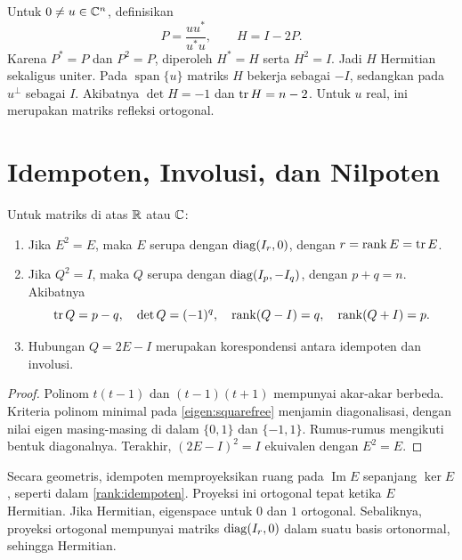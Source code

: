 \begin{exam}
    Untuk $0\ne u\in\mathbb{C}^n$, definisikan
    \[
        P=\frac{uu^*}{u^*u},\qquad H=I-2P.
    \]
    Karena $P^*=P$ dan $P^2=P$, diperoleh $H^*=H$ serta $H^2=I$.
    Jadi $H$ Hermitian sekaligus uniter. Pada $\operatorname{span}\{u\}$
    matriks $H$ bekerja sebagai $-I$, sedangkan pada $u^\perp$
    sebagai $I$. Akibatnya $\det H=-1$ dan $\operatorname{tr} H=n-2$.
    Untuk $u$ real, ini merupakan matriks refleksi ortogonal.
\end{exam}

\section{Idempoten, Involusi, dan Nilpoten}
\label{khusus:polinomial}

\begin{teorema}
    Untuk matriks di atas $\mathbb{R}$ atau $\mathbb{C}$:
    \begin{enumerate}[label=(\roman*),nosep]
        \item Jika $E^2=E$, maka $E$ serupa dengan $\operatorname{diag}(I_r,0)$,
            dengan $r=\operatorname{rank} E=\operatorname{tr} E$.
        \item Jika $Q^2=I$, maka $Q$ serupa dengan $\operatorname{diag}(I_p,-I_q)$,
            dengan $p+q=n$. Akibatnya
            \[
                \operatorname{tr} Q=p-q,\quad\det Q=(-1)^q,\quad
                \operatorname{rank}(Q-I)=q,\quad\operatorname{rank}(Q+I)=p.
            \]
        \item Hubungan $Q=2E-I$ merupakan korespondensi antara
            idempoten dan involusi.
    \end{enumerate}
\end{teorema}
\begin{proof}
    Polinom $t(t-1)$ dan $(t-1)(t+1)$ mempunyai akar-akar berbeda.
    Kriteria polinom minimal pada \autoref{eigen:squarefree}
    menjamin diagonalisasi, dengan nilai eigen masing-masing
    di dalam $\{0,1\}$ dan $\{-1,1\}$. Rumus-rumus mengikuti
    bentuk diagonalnya. Terakhir,
    $(2E-I)^2=I$ ekuivalen dengan $E^2=E$.
\end{proof}

Secara geometris, idempoten memproyeksikan ruang pada
$\operatorname{Im}E$ sepanjang $\ker E$, seperti dalam
\autoref{rank:idempoten}. Proyeksi ini ortogonal tepat ketika
$E$ Hermitian. Jika Hermitian, eigenspace untuk $0$ dan $1$
ortogonal. Sebaliknya, proyeksi ortogonal mempunyai matriks
$\operatorname{diag}(I_r,0)$ dalam suatu basis ortonormal, sehingga Hermitian.

